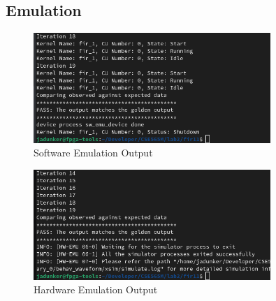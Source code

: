 \documentclass[11pt]{article}
\begin{document}
      \subsection{Emulation}
      \begin{figure}[h]
        \centering
        \includegraphics[width=0.8\textwidth]{opt_sw_emu.png}
        \caption{Software Emulation Output}
        \label{fig:opt_sw_emu_out}
      \end{figure}
      \begin{figure}[h]
        \centering
        \includegraphics[width=0.8\textwidth]{opt_hw_emu.png}
        \caption{Hardware Emulation Output}
        \label{fig:opt_hw_emu_out}
      \end{figure}
\end{document}
